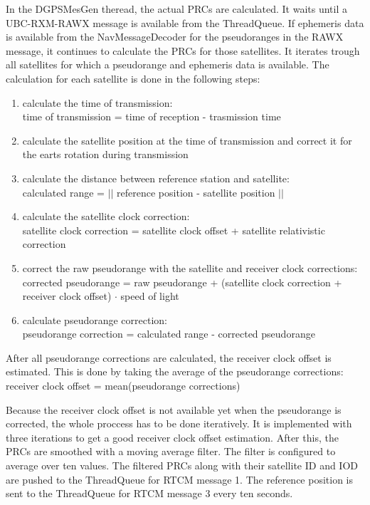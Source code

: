 In the DGPSMesGen theread, the actual PRCs are calculated.
It waits until a UBC-RXM-RAWX message is available from the ThreadQueue.
If ephemeris data is available from the NavMessageDecoder for the pseudoranges in the RAWX message, it continues to calculate the PRCs for those satellites.
It iterates trough all satellites for which a pseudorange and ephemeris data is available.
The calculation for each satellite is done in the following steps:
\begin{enumerate}
 \setlength\itemsep{0.1cm}
 \item calculate the time of transmission: \\
 time of transmission = time of reception - trasmission time
 \item calculate the satellite position at the time of transmission and correct it for the earts rotation during transmission
 \item calculate the distance between reference station and satellite: \\
 calculated range = $\lvert \lvert$ reference position - satellite position $\rvert \rvert$
 \item calculate the satellite clock correction: \\
 satellite clock correction = satellite clock offset + satellite relativistic correction
 \item correct the raw pseudorange with the satellite and receiver clock corrections: \\
 corrected pseudorange = raw pseudorange + (satellite clock correction + receiver clock offset) $\cdot$ speed of light
 \item calculate pseudorange correction: \\
 pseudorange correction = calculated range - corrected pseudorange
\end{enumerate}
After all pseudorange corrections are calculated, the receiver clock offset is estimated.
This is done by taking the average of the pseudorange corrections: \\
receiver clock offset = mean(pseudorange corrections)

Because the receiver clock offset is not available yet when the pseudorange is corrected, the whole proccess has to be done iteratively.
It is implemented with three iterations to get a good receiver clock offset estimation.
After this, the PRCs are smoothed with a moving average filter.
The filter is configured to average over ten values.
The filtered PRCs along with their satellite ID and IOD are pushed to the ThreadQueue for RTCM message 1.
The reference position is sent to the ThreadQueue for RTCM message 3 every ten seconds.

